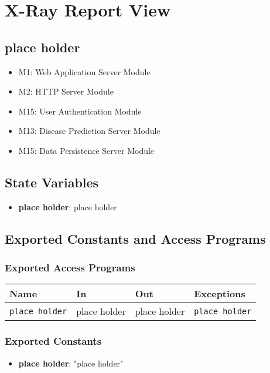 \documentclass[12pt, titlepage]{article}
\begin{document}
\section{X-Ray Report View}

\subsection{place holder}
\begin{itemize}
\item M1: Web Application Server Module
\item M2: HTTP Server Module
\item M15: User Authentication Module
\item M13: Disease Prediction Server Module 
\item M15: Data Persistence Server Module
\end{itemize}

\subsection{State Variables}
\begin{itemize}
\item \textbf{place holder}: place holder
\end{itemize}

\subsection{Exported Constants and Access Programs}
\subsubsection{Exported Access Programs}
\begin{tabular}{|l|l|l|l|}
    \hline
    \textbf{Name} & \textbf{In} & \textbf{Out} & \textbf{Exceptions} \\
    \hline 
    \texttt{place holder} & place holder & place holder & \texttt{place holder} \\
    \hline
\end{tabular}

\subsubsection{Exported Constants}
\begin{itemize}
\item \textbf{place holder}: "place holder" 
\end{itemize}
\end{document}
